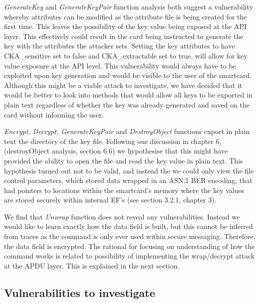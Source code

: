 \documentclass[bsc,frontabs,twoside,singlespacing,parskip,deptreport]{infthesis}     %
\begin{document}
\textit{GenerateKey} and \textit{GenerateKeyPair} function analysis both suggest a vulnerability whereby attributes can be modified as the attribute file is being created for the first time. This leaves the possibility of the key value being exposed at the API layer. This effectively could result in the card being instructed to generate the key with the attributes the attacker sets. Setting the key attributes to have CKA\_sensitive set to false and CKA\_extractable set to true, will allow for key value exposure at the API level. This vulnerability would always have to be exploited upon key generation and would be visible to the user of the smartcard. Although this might be a viable attack to investigate, we have decided that it would be better to look into methods that would allow all keys to be exported in plain text regardless of whether the key was already generated and saved on the card without informing the user.

\textit{Encrypt, Decrypt, GenerateKeyPair} and \textit{DestroyObject} functions export in plain text the directory of the key file. Following our discussion in chapter 6, (destroyObject analysis, section 6.6) we hypothesise that this might have provided the ability to open the file and read the key value in plain text. This hypothesis turned out not to be valid, and instead the  we could only view the file control parameters, which stored data wrapped in an ASN.1 BER encoding, that had pointers to locations within the smartcard's memory where the key values are stored securely within internal EF's (see section 3.2.1, chapter 3).

We find that \textit{Unwrap} function does not reveal any vulnerabilities. Instead we would like to learn exactly how the data field is built, but this cannot be inferred from traces as the command is only ever used within secure messaging. Therefore, the data field is encrypted. The rational for focusing on understanding of how the command works is related to possibility of implementing the wrap/decrypt attack at the APDU layer. This is explained in the next section.

\subsection{Vulnerabilities to investigate}
\end{document}
